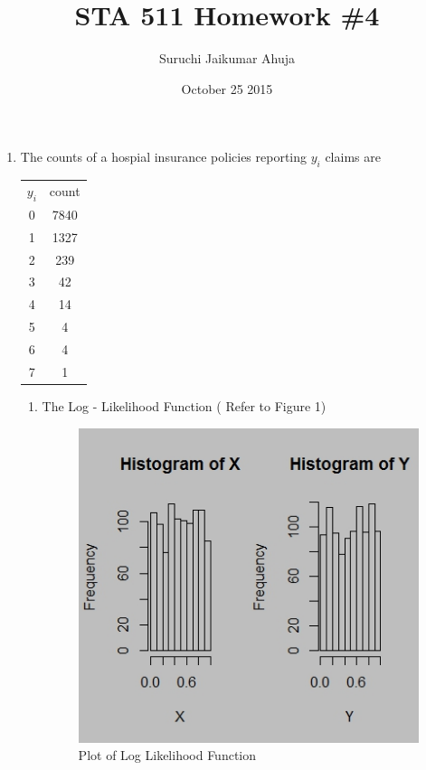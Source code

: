 \documentclass[11pt]{article}
\begin{document}
\title{STA 511 Homework \#4}
\date{October 25 2015}
\author{Suruchi Jaikumar Ahuja}
\maketitle

\begin{enumerate}

\item The counts of a hospial insurance policies reporting $ {y_i} $ claims are \\


\begin{center}
\begin{tabular}{ c  c }
$ {y_i} $ & count \\
0 & 7840 \\
1 & 1327 \\
2 & 239 \\
3 & 42 \\
4 & 14 \\
5 & 4 \\
6 & 4 \\
7 & 1 \\
\end{tabular}
\end{center}

\begin{enumerate}
 
 
 \item The Log - Likelihood Function ( Refer to Figure 1) \\
  \begin{figure}[h]
    \centering
     \includegraphics[scale=0.5]{fig1.jpeg}
      \caption{ Plot of Log Likelihood Function }
        \label{Figure 1}
\end{figure}


\end{enumerate}
\end{enumerate}
\end{document}
